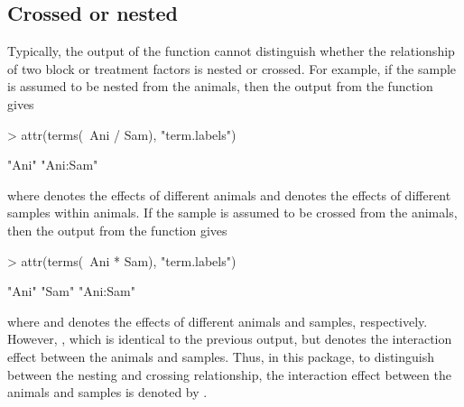 \documentclass[article]{jss}
\begin{document}
\subsection{Crossed or nested}
Typically, the output of the  function cannot distinguish whether the relationship of two block or treatment factors is nested or crossed. For example, if the sample is assumed to be nested from the animals, then the output from the  function gives
\begin{CodeChunk}
\begin{CodeInput}
> attr(terms(~Ani / Sam), "term.labels")
\end{CodeInput}
\begin{CodeOutput}
[1] "Ani"     "Ani:Sam"
\end{CodeOutput}
\end{CodeChunk}
where  denotes the effects of different animals and  denotes the effects of different samples within animals. If the sample is assumed to be crossed from the animals, then the output from the  function gives
\begin{CodeChunk}
\begin{CodeInput}
> attr(terms(~Ani * Sam), "term.labels")
\end{CodeInput}
\begin{CodeOutput}
[1] "Ani"     "Sam"     "Ani:Sam"
\end{CodeOutput}
\end{CodeChunk}
where  and  denotes the effects of different animals and samples, respectively. However, , which is identical to the previous output, but denotes the interaction effect between the animals and samples. Thus, in this package, to distinguish between the nesting and crossing relationship, the interaction effect between the animals and samples is denoted by . 
\end{document}
